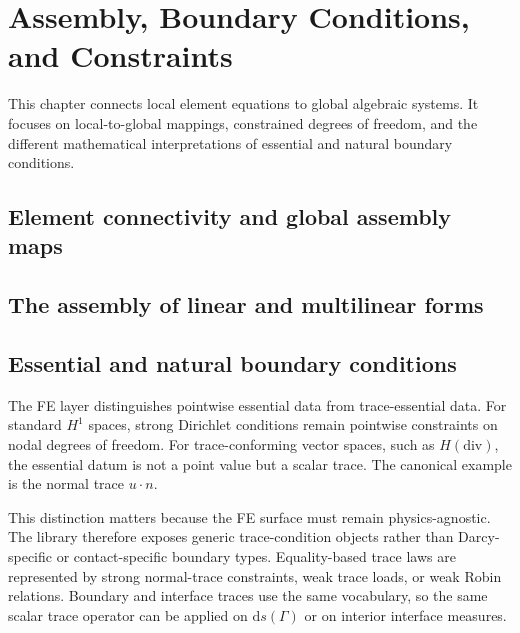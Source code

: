 \chapter{Assembly, Boundary Conditions, and Constraints}
\label{ch:assembly}

This chapter connects local element equations to global algebraic systems. It
focuses on local-to-global mappings, constrained degrees of freedom, and the
different mathematical interpretations of essential and natural boundary
conditions.

\section{Element connectivity and global assembly maps}
\label{sec:assembly:connectivity}


\section{The assembly of linear and multilinear forms}
\label{sec:assembly:forms}


\section{Essential and natural boundary conditions}
\label{sec:assembly:boundary}

The FE layer distinguishes pointwise essential data from trace-essential data.
For standard $H^1$ spaces, strong Dirichlet conditions remain pointwise
constraints on nodal degrees of freedom. For trace-conforming vector spaces,
such as $H(\mathrm{div})$, the essential datum is not a point value but a
scalar trace. The canonical example is the normal trace $u \cdot n$.

This distinction matters because the FE surface must remain physics-agnostic.
The library therefore exposes generic trace-condition objects rather than
Darcy-specific or contact-specific boundary types. Equality-based trace laws
are represented by strong normal-trace constraints, weak trace loads, or weak
Robin relations. Boundary and interface traces use the same vocabulary, so the
same scalar trace operator can be applied on $\mathrm{d}s(\Gamma)$ or on
interior interface measures.

